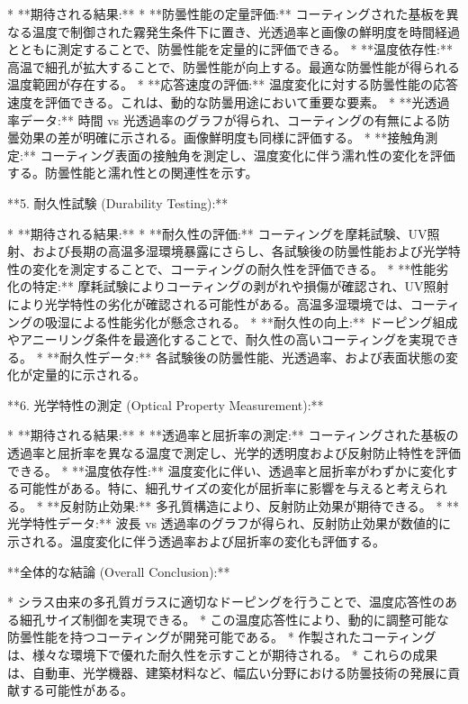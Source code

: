\documentclass{article}
\begin{document}
*   **期待される結果:**
    *   **防曇性能の定量評価:** コーティングされた基板を異なる温度で制御された霧発生条件下に置き、光透過率と画像の鮮明度を時間経過とともに測定することで、防曇性能を定量的に評価できる。
    *   **温度依存性:** 高温で細孔が拡大することで、防曇性能が向上する。最適な防曇性能が得られる温度範囲が存在する。
    *   **応答速度の評価:** 温度変化に対する防曇性能の応答速度を評価できる。これは、動的な防曇用途において重要な要素。
    *   **光透過率データ:** 時間 vs 光透過率のグラフが得られ、コーティングの有無による防曇効果の差が明確に示される。画像鮮明度も同様に評価する。
    *   **接触角測定:** コーティング表面の接触角を測定し、温度変化に伴う濡れ性の変化を評価する。防曇性能と濡れ性との関連性を示す。

**5. 耐久性試験 (Durability Testing):**

*   **期待される結果:**
    *   **耐久性の評価:** コーティングを摩耗試験、UV照射、および長期の高温多湿環境暴露にさらし、各試験後の防曇性能および光学特性の変化を測定することで、コーティングの耐久性を評価できる。
    *   **性能劣化の特定:** 摩耗試験によりコーティングの剥がれや損傷が確認され、UV照射により光学特性の劣化が確認される可能性がある。高温多湿環境では、コーティングの吸湿による性能劣化が懸念される。
    *   **耐久性の向上:** ドーピング組成やアニーリング条件を最適化することで、耐久性の高いコーティングを実現できる。
    *   **耐久性データ:** 各試験後の防曇性能、光透過率、および表面状態の変化が定量的に示される。

**6. 光学特性の測定 (Optical Property Measurement):**

*   **期待される結果:**
    *   **透過率と屈折率の測定:** コーティングされた基板の透過率と屈折率を異なる温度で測定し、光学的透明度および反射防止特性を評価できる。
    *   **温度依存性:** 温度変化に伴い、透過率と屈折率がわずかに変化する可能性がある。特に、細孔サイズの変化が屈折率に影響を与えると考えられる。
    *   **反射防止効果:** 多孔質構造により、反射防止効果が期待できる。
    *   **光学特性データ:** 波長 vs 透過率のグラフが得られ、反射防止効果が数値的に示される。温度変化に伴う透過率および屈折率の変化も評価する。

**全体的な結論 (Overall Conclusion):**

*   シラス由来の多孔質ガラスに適切なドーピングを行うことで、温度応答性のある細孔サイズ制御を実現できる。
*   この温度応答性により、動的に調整可能な防曇性能を持つコーティングが開発可能である。
*   作製されたコーティングは、様々な環境下で優れた耐久性を示すことが期待される。
*   これらの成果は、自動車、光学機器、建築材料など、幅広い分野における防曇技術の発展に貢献する可能性がある。
\end{document}
